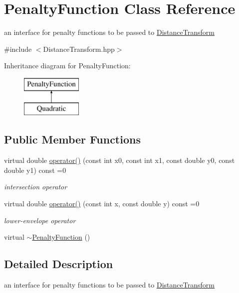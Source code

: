 \hypertarget{class_penalty_function}{\section{Penalty\-Function Class Reference}
\label{class_penalty_function}
}


an interface for penalty functions to be passed to \hyperlink{class_distance_transform}{Distance\-Transform}  




{\ttfamily \#include $<$Distance\-Transform.\-hpp$>$}

Inheritance diagram for Penalty\-Function\-:\begin{figure}[H]
\begin{center}
\leavevmode
\includegraphics[height=2.000000cm]{class_penalty_function}
\end{center}
\end{figure}
\subsection*{Public Member Functions}
\begin{DoxyCompactItemize}
\item 
virtual double \hyperlink{class_penalty_function_a944230ce310515b1fe10972388c00042}{operator()} (const int x0, const int x1, const double y0, const double y1) const =0
\begin{DoxyCompactList}\small\item\em intersection operator \end{DoxyCompactList}\item 
virtual double \hyperlink{class_penalty_function_ad1f2cdbcfc85d0eaf3b734cafce60c48}{operator()} (const int x, const double y) const =0
\begin{DoxyCompactList}\small\item\em lower-\/envelope operator \end{DoxyCompactList}\item 
virtual \hyperlink{class_penalty_function_ac97741baf27aa9e506f430338f460498}{$\sim$\-Penalty\-Function} ()
\end{DoxyCompactItemize}


\subsection{Detailed Description}
an interface for penalty functions to be passed to \hyperlink{class_distance_transform}{Distance\-Transform} 

